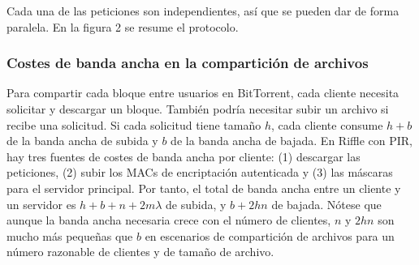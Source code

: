 	Cada una de las peticiones son independientes, así que se pueden dar de forma paralela. En la figura 2 se resume el protocolo.

\subsubsection{Costes de banda ancha en la compartición de archivos}

Para compartir cada bloque entre usuarios en BitTorrent, cada cliente necesita solicitar y descargar un bloque. También podría necesitar subir un archivo si recibe una solicitud. Si cada solicitud tiene tamaño $h$, cada cliente consume $h+b$ de la banda ancha de subida y $b$ de la banda ancha de bajada. En Riffle con PIR, hay tres fuentes de costes de banda ancha por cliente: (1) descargar las peticiones, (2) subir los MACs de encriptación autenticada y (3) las máscaras para el servidor principal.  Por tanto, el total de banda ancha entre un cliente y un servidor es $h+b+n+2m \lambda$ de subida, y $b+2hn$ de bajada. Nótese que aunque la banda ancha necesaria crece con el número de clientes, $n$ y $2hn$ son mucho más pequeñas que $b$ en escenarios de compartición de archivos para un número razonable de clientes y de tamaño de archivo. 

